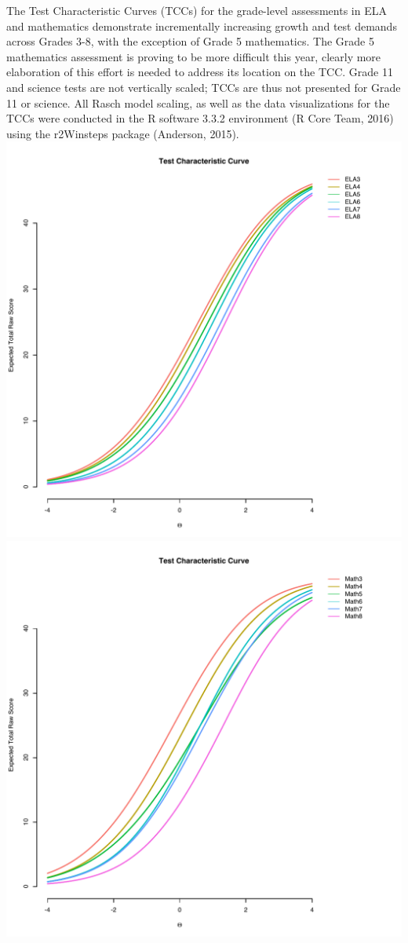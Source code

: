 \documentclass[]{article}
\begin{document}
The Test Characteristic Curves (TCCs) for the grade-level assessments in
ELA and mathematics demonstrate incrementally increasing growth and test
demands across Grades 3-8, with the exception of Grade 5 mathematics.
The Grade 5 mathematics assessment is proving to be more difficult this
year, clearly more elaboration of this effort is needed to address its
location on the TCC. Grade 11 and science tests are not vertically
scaled; TCCs are thus not presented for Grade 11 or science. All Rasch
model scaling, as well as the data visualizations for the TCCs were
conducted in the R software 3.3.2 environment (R Core Team, 2016) using
the r2Winsteps package (Anderson, 2015). \FloatBarrier
\includegraphics{tccs/ela_tccs.pdf} \includegraphics{tccs/math_tccs.pdf}
\clearpage
\end{document}
